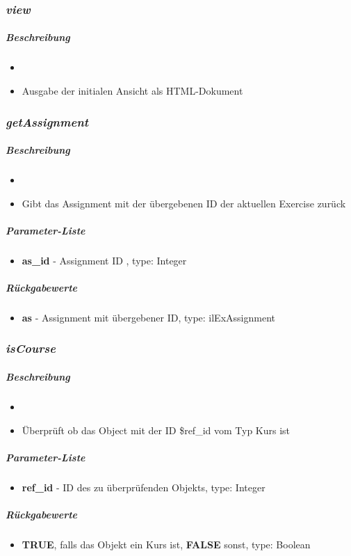 \subsubsection*{\textit{view}}\label{viewTGUI}
\subparagraph{Beschreibung}
\begin{itemize}
	\item[] \noindent{}
	\item[] Ausgabe der initialen Ansicht als HTML-Dokument
\end{itemize}

\subsubsection*{\textit{getAssignment}}\label{getAssignmentTGUI}
\subparagraph{Beschreibung}
\begin{itemize}
	\item[] \noindent{}
	\item[] Gibt das Assignment mit der übergebenen ID der aktuellen Exercise zurück
\end{itemize}
\subparagraph{Parameter-Liste}
\begin{itemize}
	\item[] \textbf{as\_id} - Assignment ID , type: Integer
\end{itemize}
\subparagraph{Rückgabewerte}
\begin{itemize}
	\item[] \textbf{as} - Assignment mit übergebener ID, type: ilExAssignment
\end{itemize}

\subsubsection*{\textit{isCourse}}\label{isCourseTGUI}
\subparagraph{Beschreibung}
\begin{itemize}
	\item[] \noindent{}
	\item[] Überprüft ob das Object mit der ID \$ref\_id vom Typ Kurs ist
\end{itemize}
\subparagraph{Parameter-Liste}
\begin{itemize}
	\item[] \textbf{ref\_id} - ID des zu überprüfenden Objekts, type: Integer
\end{itemize}
\subparagraph{Rückgabewerte}
\begin{itemize}
	\item[] \textbf{TRUE}, falls das Objekt ein Kurs ist, \textbf{FALSE} sonst, type: Boolean
\end{itemize}


